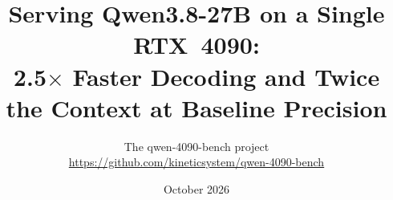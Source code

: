 \documentclass[10pt,twocolumn]{article}
\title{\Large\bfseries Serving Qwen3.8-27B on a Single RTX~4090:\\
       2.5$\times$ Faster Decoding and Twice the Context at Baseline Precision}
\author{The qwen-4090-bench project\\\small\url{https://github.com/kineticsystem/qwen-4090-bench}}
\date{October 2026}
\begin{document}
\maketitle












\onecolumn
\appendix

\end{document}
